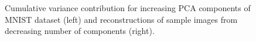 \documentclass[11pt]{article}
\begin{document}
\begin{figure}[h]
    \centering
    \begin{minipage}{0.45\textwidth}
        \centering
    \end{minipage}\hfill
    \begin{minipage}{0.45\textwidth}
        \centering
    \end{minipage}
    \caption{Cumulative variance contribution for increasing PCA components of MNIST dataset (left) and reconstructions of sample images from decreasing number of components (right).}
    \label{pca_variance}
\end{figure}
\end{document}
